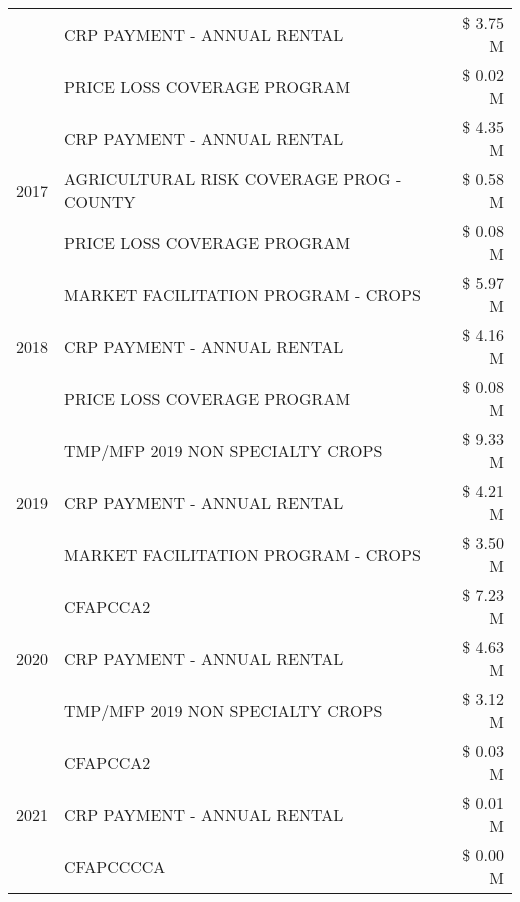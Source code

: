 \begin{tabular}{llr}
 & CRP PAYMENT - ANNUAL RENTAL                   & \$ 3.75 M \\
 & PRICE LOSS COVERAGE PROGRAM                   & \$ 0.02 M \\
\cline{1-3}
\multirow[t]{3}{*}{2017} & CRP PAYMENT - ANNUAL RENTAL & \$ 4.35 M \\
 & AGRICULTURAL RISK COVERAGE PROG - COUNTY & \$ 0.58 M \\
 & PRICE LOSS COVERAGE PROGRAM & \$ 0.08 M \\
\cline{1-3}
\multirow[t]{3}{*}{2018} & MARKET FACILITATION PROGRAM - CROPS & \$ 5.97 M \\
 & CRP PAYMENT - ANNUAL RENTAL & \$ 4.16 M \\
 & PRICE LOSS COVERAGE PROGRAM & \$ 0.08 M \\
\cline{1-3}
\multirow[t]{3}{*}{2019} & TMP/MFP 2019 NON SPECIALTY CROPS & \$ 9.33 M \\
 & CRP PAYMENT - ANNUAL RENTAL & \$ 4.21 M \\
 & MARKET FACILITATION PROGRAM - CROPS & \$ 3.50 M \\
\cline{1-3}
\multirow[t]{3}{*}{2020} & CFAPCCA2 & \$ 7.23 M \\
 & CRP PAYMENT - ANNUAL RENTAL & \$ 4.63 M \\
 & TMP/MFP 2019 NON SPECIALTY CROPS & \$ 3.12 M \\
\cline{1-3}
\multirow[t]{3}{*}{2021} & CFAPCCA2 & \$ 0.03 M \\
 & CRP PAYMENT - ANNUAL RENTAL & \$ 0.01 M \\
 & CFAPCCCCA & \$ 0.00 M \\
\cline{1-3}
\bottomrule
\end{tabular}

